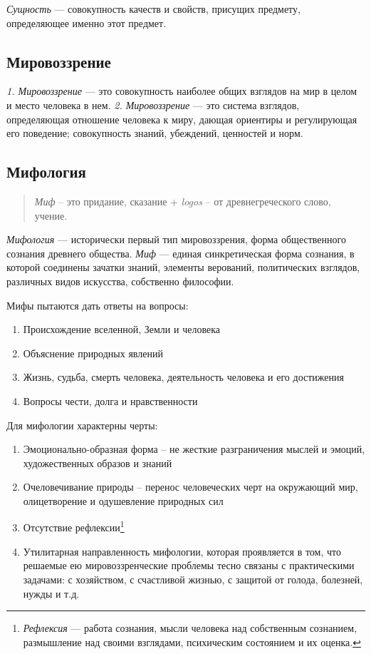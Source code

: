 \documentclass[a4paper, 14pt]{extreport}
\begin{document}
\emph{Сущность} ---
совокупность качеств и свойств, присущих предмету, определяющее именно
этот предмет.


\subsection{Мировоззрение}

\emph{1. Мировоззрение} ---
это совокупность наиболее общих взглядов на мир в целом и место человека
в нем.
\emph{2. Мировоззрение} ---
это система взглядов, определяющая отношение человека к миру, дающая
ориентиры и регулирующая его поведение; совокупность знаний, убеждений,
ценностей и норм.


\subsection{Мифология}

\begin{quote}
\emph{Миф} -- это придание, сказание + \emph{logos} -- от
древнегреческого слово, учение.
\end{quote}

\emph{Мифология} ---
исторически первый тип мировоззрения, форма общественного сознания
древнего общества.
\emph{Миф} ---
единая синкретическая форма сознания, в которой соединены зачатки
знаний, элементы верований, политических взглядов, различных видов
искусства, собственно философии.


Мифы пытаются дать ответы на вопросы:

\begin{enumerate}
\def\labelenumi{\arabic{enumi}.}

\item
  Происхождение вселенной, Земли и человека
\item
  Объяснение природных явлений
\item
  Жизнь, судьба, смерть человека, деятельность человека и его достижения
\item
  Вопросы чести, долга и нравственности
\end{enumerate}

Для мифологии характерны черты:

\begin{enumerate}
\def\labelenumi{\arabic{enumi}.}

\item
  Эмоционально-образная форма -- не жесткие разграничения мыслей и
  эмоций, художественных образов и знаний
\item
  Очеловечивание природы -- перенос человеческих черт на окружающий мир,
  олицетворение и одушевление природных сил
\item
  Отсутствие рефлексии\footnote{
    
    \emph{Рефлексия} ---
    работа сознания, мысли человека над собственным сознанием,
    размышление над своими взглядами, психическим состоянием и их
    оценка.
    }
\item
  Утилитарная направленность мифологии, которая проявляется в том, что
  решаемые ею мировоззренческие проблемы тесно связаны с практическими
  задачами: с хозяйством, с счастливой жизнью, с защитой от голода,
  болезней, нужды и т.д.
\end{enumerate}
\end{document}
